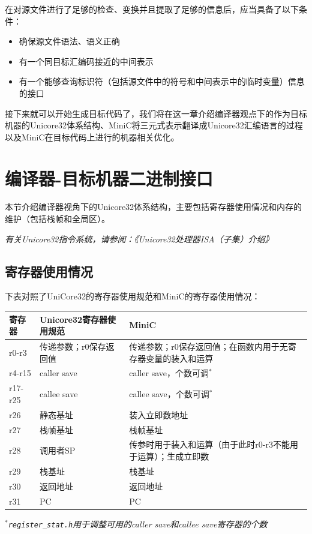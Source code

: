 在对源文件进行了足够的检查、变换并且提取了足够的信息后，应当具备了以下条件：
\begin{itemize}
	\item 确保源文件语法、语义正确
	\item 有一个同目标汇编码接近的中间表示
	\item 有一个能够查询标识符（包括源文件中的符号和中间表示中的临时变量）信息的接口
\end{itemize}
接下来就可以开始生成目标代码了，我们将在这一章介绍编译器观点下的作为目标机器的Unicore32体系结构、MiniC将三元式表示翻译成Unicore32汇编语言的过程以及MiniC在目标代码上进行的机器相关优化。
\section{编译器-目标机器二进制接口}
\label{target_machine}
本节介绍编译器视角下的Unicore32体系结构，主要包括寄存器使用情况和内存的维护（包括栈帧和全局区）。

{\it \anchor 有关Unicore32指令系统，请参阅：《Unicore32处理器ISA（子集）介绍》}\\

\subsection{寄存器使用情况}
下表对照了UniCore32的寄存器使用规范和MiniC的寄存器使用情况：
\begin{center}
	\begin{tabular}{|l|l|l|}
	\hline
		寄存器 & Unicore32寄存器使用规范 & MiniC \\
	\hline
		r0-r3 & 传递参数；r0保存返回值 & 传递参数；r0保存返回值；在函数内用于无寄存器变量的装入和运算 \\
	\hline
		r4-r15 & caller save & caller save，个数可调$^*$\\
	\hline
		r17-r25 & callee save & callee save，个数可调$^*$\\
	\hline
		r26 & 静态基址 & 装入立即数地址\\
	\hline
		r27 & 栈帧基址 & 栈帧基址\\
	\hline  
		r28 & 调用者SP & 传参时用于装入和运算（由于此时r0-r3不能用于运算）；生成立即数\\
	\hline 
		r29 & 栈基址 & 栈基址 \\
	\hline
		r30 & 返回地址 & 返回地址 \\
	\hline 
		r31 & PC & PC \\
	\hline
	\end{tabular}
	\label{registerstat}
\end{center}
{\it $^*$\verb|register_stat.h|用于调整可用的caller save和callee save寄存器的个数}

